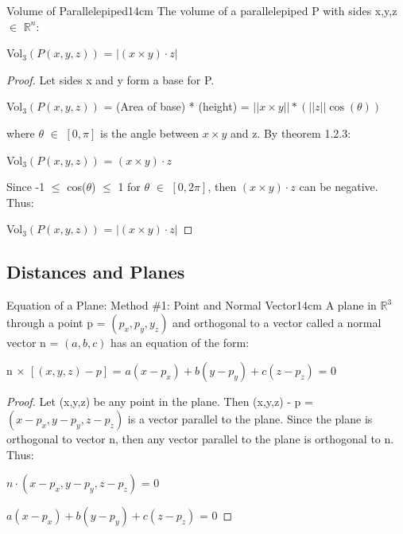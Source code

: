     \begin{wtheorem}{Volume of Parallelepiped}{14cm}
        The volume of a parallelepiped P with sides x,y,z $\in$ $\mathbb{R}^n$:

        \hspace{0.5cm}
        Vol$_3(P(x,y,z))$
        = $|(x \times y) \cdot z|$
    \end{wtheorem}

    \begin{proof}
        Let sides x and y form a base for P.

        \hspace{0.5cm}
        Vol$_3(P(x,y,z))$
        = (Area of base) * (height)
        = $||x \times y|| * (||z|| \cos(\theta))$

        where $\theta$ $\in$ $[0,\pi]$ is the angle between $x \times y$
        and z. By {\color{red} theorem 1.2.3}:

        \hspace{0.5cm}
        Vol$_3(P(x,y,z))$ = $(x \times y) \cdot z$

        Since -1 $\leq$ cos($\theta$) $\leq$ 1 for $\theta$ $\in$ $[0,2\pi]$, then
        $(x \times y) \cdot z$ can be negative. Thus:

        \hspace{0.5cm}
        Vol$_3(P(x,y,z))$ = $|(x \times y) \cdot z|$
    \end{proof}

    \vspace{0.5cm}





\subsection{ Distances and Planes }

    \begin{wtheorem}{Equation of a Plane: Method \#1: Point and Normal Vector}{14cm}
        A plane in $\mathbb{R}^3$ through a point p = $(p_x,p_y,y_z)$
        and orthogonal to a vector called a normal vector
        n = $(a,b,c)$ has an equation of the form:

        \hspace{0.5cm}
        n $\times$ $[(x,y,z)-p]$ = $a(x-p_x) + b(y-p_y) + c(z-p_z)$ = 0
    \end{wtheorem}

    \begin{proof}
        Let (x,y,z) be any point in the plane.
        Then (x,y,z) - p = $(x-p_x,y-p_y,z-p_z)$ is a vector
        parallel to the plane. Since the plane is orthogonal to vector n,
        then any vector parallel to the plane is orthogonal to n. Thus:

        \hspace{0.5cm}
        $n \cdot (x-p_x,y-p_y,z-p_z)$ = 0

        \hspace{0.5cm}
        $ a(x-p_x) + b(y-p_y) + c(z-p_z)$ = 0
    \end{proof}

